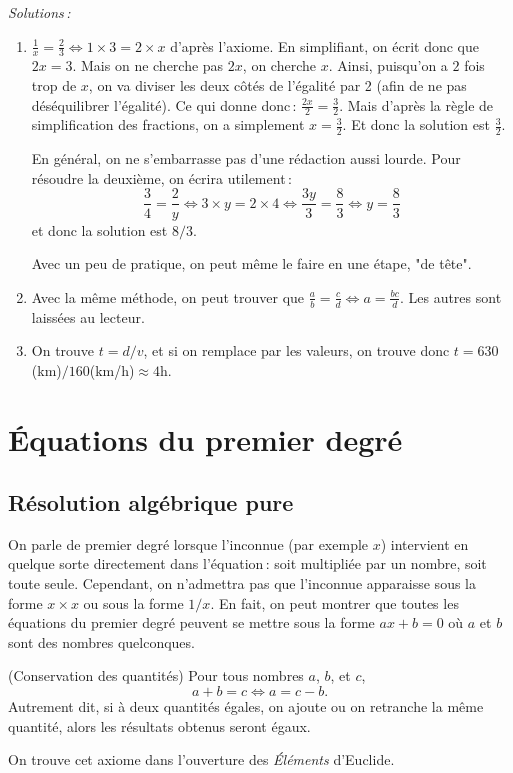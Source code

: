 	\emph{Solutions\,:}
	\begin{enumerate}
		\item $\frac{1}{x}=\frac{2}{3} \Leftrightarrow 1\times 3 = 2\times x$ d'après l'axiome. En simplifiant, on écrit donc que $2x=3$. Mais on ne cherche pas $2x$, on cherche $x$. Ainsi, puisqu'on a $2$ fois trop de $x$, on va diviser les deux côtés de l'égalité par 2 (afin de ne pas déséquilibrer l'égalité). Ce qui donne donc\,: $\frac{2x}{2}=\frac{3}{2}$. Mais d'après la règle de simplification des fractions, on a simplement $x=\frac{3}{2}$. Et donc la solution est $\frac{3}{2}$. 

		En général, on ne s'embarrasse pas d'une rédaction aussi lourde. Pour résoudre la deuxième, on écrira utilement\,:
		\begin{equation}
			\frac{3}{4}=\frac{2}{y} \Leftrightarrow 3\times y = 2\times 4 \Leftrightarrow \frac{3y}{3}=\frac{8}{3} \Leftrightarrow y=\frac{8}{3} \nonumber
		\end{equation}
		et donc la solution est $8/3$.

		Avec un peu de pratique, on peut même le faire en une étape, "de tête".

	\item Avec la même méthode, on peut trouver que $\frac{a}{b}=\frac{c}{d}\Leftrightarrow a=\frac{bc}{d}$. Les autres sont laissées au lecteur.
	\item On trouve $t=d/v$, et si on remplace par les valeurs, on trouve donc $t=630$(km)$/160$(km/h)$\approx 4$h.

	\end{enumerate}
	
\chapter{Équations du premier degré}\label{chap_eqp}
	\section{Résolution algébrique pure}
		On parle de premier degré lorsque l'inconnue (par exemple $x$) intervient en quelque sorte directement dans l'équation\,: soit multipliée par un nombre, soit toute seule. Cependant, on n'admettra pas que l'inconnue apparaisse sous la forme $x\times x$ ou sous la forme $1/x$. En fait, on peut montrer que toutes les équations du premier degré peuvent se mettre sous la forme $ax+b=0$ où $a$ et $b$ sont des nombres quelconques. 

		\begin{axi} (Conservation des quantités)
			Pour tous nombres $a$, $b$, et $c$,
			\begin{equation}
				a+b=c \Leftrightarrow a=c-b.
			\end{equation}
			Autrement dit, si à deux quantités égales, on ajoute ou on retranche la même quantité, alors les résultats obtenus seront égaux.\item{On trouve cet axiome dans l'ouverture des \emph{Éléments} d'Euclide.}
		\end{axi}

